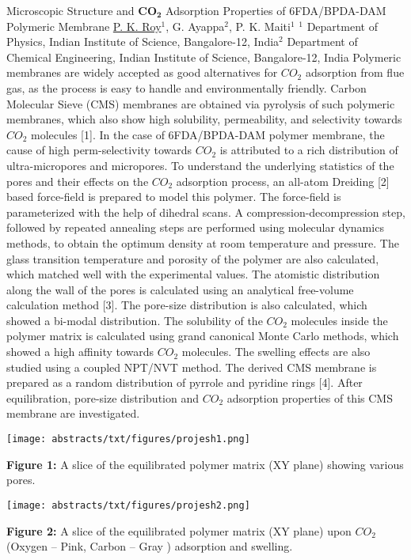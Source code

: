
    \begin{abstract_online}{Microscopic Structure and $\mathbf{CO_2}$ Adsorption Properties of 6FDA/BPDA-DAM Polymeric Membrane}{%
        \underline{P. K. Roy}$^{1}$, G. Ayappa$^{2}$, P. K. Maiti$^{1}$}{%
        }{%
        $^1$ Department of Physics, Indian Institute of Science, Bangalore-12, India\newline{}$^2$ Department of Chemical Engineering, Indian Institute of Science, Bangalore-12, India}
    Polymeric membranes are widely accepted as good alternatives for $CO_2$ adsorption from flue gas, as the process is easy to handle and environmentally friendly. Carbon Molecular Sieve (CMS) membranes are obtained via pyrolysis of such polymeric membranes, which also show high solubility, permeability, and selectivity towards $CO_2$ molecules [1]. In the case of 6FDA/BPDA-DAM polymer membrane, the cause of high perm-selectivity towards $CO_2$ is attributed to a rich distribution of ultra-micropores and micropores. To understand the underlying statistics of the pores and their effects on the $CO_2$ adsorption process, an all-atom Dreiding [2] based force-field is prepared to model this polymer. The force-field is parameterized with the help of dihedral scans. A compression-decompression step, followed by repeated annealing steps are performed using molecular dynamics methods, to obtain the optimum density at room temperature and pressure. The glass transition temperature and porosity of the polymer are also calculated, which matched well with the experimental values. The atomistic distribution along the wall of the pores is calculated using an analytical free-volume calculation method [3]. The pore-size distribution is also calculated, which showed a bi-modal distribution. The solubility of the $CO_2$ molecules inside the polymer matrix is calculated using grand canonical Monte Carlo methods, which showed a high affinity towards $CO_2$ molecules. The swelling effects are also studied using a coupled NPT/NVT method. The derived CMS membrane is prepared as a random distribution of pyrrole and pyridine rings [4]. After equilibration, pore-size distribution and $CO_2$ adsorption properties of this CMS membrane are investigated. \begin{center}  \texttt{[image: abstracts/txt/figures/projesh1.png]}  \caption{\textbf{Figure 1:} A slice of the equilibrated polymer matrix (XY plane) showing various pores.}  \end{center}  \begin{center}  \texttt{[image: abstracts/txt/figures/projesh2.png]}  \caption{\textbf{Figure 2:} A slice of the equilibrated polymer matrix (XY plane) upon $CO_2$ (Oxygen – Pink, Carbon – Gray ) adsorption and swelling.}  \end{center}  
    

\end{abstract_online}
